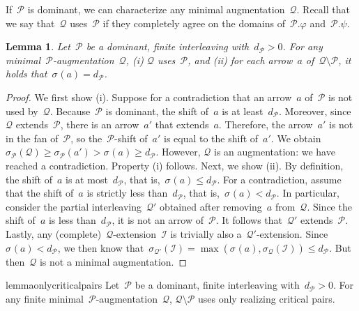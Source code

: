 \documentclass[11pt]{article}
\newtheorem{lemma}[theorem]{Lemma}
\newcommand{\shift}[1]{\sigma_{#1}}
\newcommand{\resdist}[1]{d_{#1}}
\renewcommand{\phi}{\varphi}
\newcommand{\I}{\mathcal{I}}
\renewcommand{\P}{\mathcal{P}}
\newcommand{\Q}{\mathcal{Q}}
\begin{document}
If~$\P$ is dominant, we can characterize any minimal augmentation~$\Q$.
Recall that we say that~$\Q$ uses~$\P$ if they completely agree on the domains of~$\P.\phi$ and~$\P.\psi$.
%
\begin{lemma}\label{lem:optimal-uses}
Let~$\P$ be a dominant, finite interleaving with~$\resdist{\P} > 0$.
For any minimal~$\P$-augmentation~$\Q$, (i) $\Q$ uses~$\P$, and (ii) for each arrow~$a$ of~$\Q \setminus \P$, it holds that~$\shift{}(a) = \resdist{\P}$.
\end{lemma}
\begin{proof}
We first show (i).
Suppose for a contradiction that an arrow~$a$ of~$\P$ is not used by~$\Q$.
Because~$\P$ is dominant, the shift of~$a$ is at least~$\resdist{\P}$.
Moreover, since~$\Q$ extends~$\P$, there is an arrow~$a'$ that extends~$a$.
Therefore, the arrow~$a'$ is not in the fan of~$\P$, so the~$\P$-shift of~$a'$ is equal to the shift of~$a'$.
We obtain~$\shift{\P}(\Q) \ge \shift{\P}(a') > \shift{}(a) \ge \resdist{\P}$.
However, $\Q$ is an augmentation: we have reached a contradiction.
Property (i) follows.
%
Next, we show (ii).
By definition, the shift of~$a$ is at most~$\resdist{\P}$, that is,~$\shift{}(a) \le \resdist{\P}$.
For a contradiction, assume that the shift of~$a$ is strictly less than~$\resdist{\P}$, that is,~$\shift{}(a) < \resdist{\P}$.
In particular, consider the partial interleaving~$\Q'$ obtained after removing~$a$ from~$\Q$.
Since the shift of~$a$ is less than~$\resdist{\P}$, it is not an arrow of~$\P$.
It follows that~$\Q'$ extends~$\P$.
Lastly, any (complete)~$\Q$-extension~$\I$ is trivially also a~$\Q'$-extension.
Since~$\shift{}(a) < \resdist{\P}$, we then know that~$\shift{\Q'}(\I) = \max(\shift{}(a), \shift{\Q}(\I)) \le \resdist{\P}$.
But then~$\Q$ is not a minimal augmentation.
\end{proof}
%
\begin{restatable}{lemma}{onlycriticalpairs}
\label{lem:only-critical-pairs}
Let~$\P$ be a dominant, finite interleaving with~$\resdist{\P} > 0$.
For any finite minimal~$\P$-augmentation~$\Q$, $\Q \setminus \P$ uses only realizing critical pairs.
\end{restatable}
\end{document}
